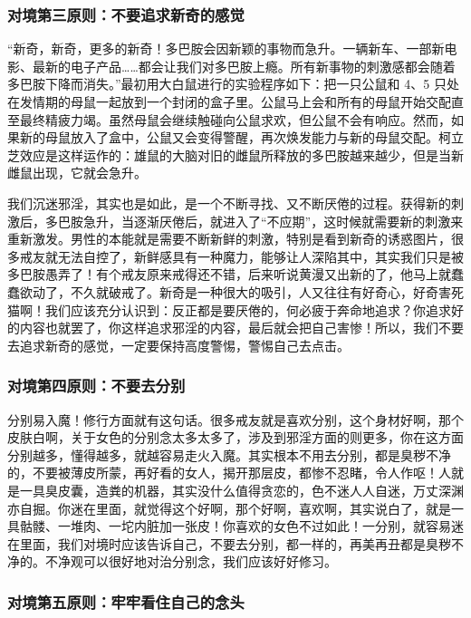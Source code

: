 \documentclass{ctexart}
\begin{document}
\subsubsection{对境第三原则：不要追求新奇的感觉}

“新奇，新奇，更多的新奇！多巴胺会因新颖的事物而急升。一辆新车、一部新电影、最新的电子产品……都会让我们对多巴胺上瘾。所有新事物的刺激感都会随着多巴胺下降而消失。”最初用大白鼠进行的实验程序如下：把一只公鼠和 4、5 只处在发情期的母鼠一起放到一个封闭的盒子里。公鼠马上会和所有的母鼠开始交配直至最终精疲力竭。虽然母鼠会继续触碰向公鼠求欢，但公鼠不会有响应。然而，如果新的母鼠放入了盒中，公鼠又会变得警醒，再次焕发能力与新的母鼠交配。柯立芝效应是这样运作的：雄鼠的大脑对旧的雌鼠所释放的多巴胺越来越少，但是当新雌鼠出现，它就会急升。

我们沉迷邪淫，其实也是如此，是一个不断寻找、又不断厌倦的过程。获得新的刺激后，多巴胺急升，当逐渐厌倦后，就进入了“不应期”，这时候就需要新的刺激来重新激发。男性的本能就是需要不断新鲜的刺激，特别是看到新奇的诱惑图片，很多戒友就无法自控了，新鲜感具有一种魔力，能够让人深陷其中，其实我们只是被多巴胺愚弄了！有个戒友原来戒得还不错，后来听说黄漫又出新的了，他马上就蠢蠢欲动了，不久就破戒了。新奇是一种很大的吸引，人又往往有好奇心，好奇害死猫啊！我们应该充分认识到：反正都是要厌倦的，何必疲于奔命地追求？你追求好的内容也就罢了，你这样追求邪淫的内容，最后就会把自己害惨！所以，我们不要去追求新奇的感觉，一定要保持高度警惕，警惕自己去点击。

\subsubsection{对境第四原则：不要去分别}

分别易入魔！修行方面就有这句话。很多戒友就是喜欢分别，这个身材好啊，那个皮肤白啊，关于女色的分别念太多太多了，涉及到邪淫方面的则更多，你在这方面分别越多，懂得越多，就越容易走火入魔。其实根本不用去分别，都是臭秽不净的，不要被薄皮所蒙，再好看的女人，揭开那层皮，都惨不忍睹，令人作呕！人就是一具臭皮囊，造粪的机器，其实没什么值得贪恋的，色不迷人人自迷，万丈深渊亦自掘。你迷在里面，就觉得这个好啊，那个好啊，喜欢啊，其实说白了，就是一具骷髅、一堆肉、一坨内脏加一张皮！你喜欢的女色不过如此！一分别，就容易迷在里面，我们对境时应该告诉自己，不要去分别，都一样的，再美再丑都是臭秽不净的。不净观可以很好地对治分别念，我们应该好好修习。

\subsubsection{对境第五原则：牢牢看住自己的念头}
\end{document}
